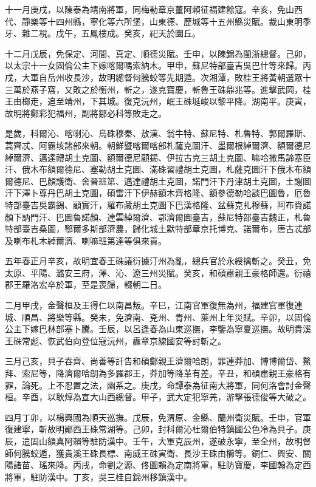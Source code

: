\begin{pinyinscope}
十一月庚戌，以陳泰為靖南將軍，同梅勒章京董阿賴征福建餘寇。辛亥，免山西代、靜樂等十四州縣，寧化等六所堡，山東德、歷城等十五州縣災賦。裁山東明季牙、雜二稅。戊午，五鳳樓成。癸亥，祀天於圜丘。

十二月戊辰，免保定、河間、真定、順德災賦。壬申，以陳錦為閩浙總督。己卯，以太宗十一女固倫公主下嫁喀爾嗎索納木。甲申，蘇尼特部臺吉吳巴什等來歸。丙戌，大軍自岳州收長沙，故明總督何騰蛟等先期遁。次湘潭，敗桂王將黃朝選眾十三萬於燕子窩，又敗之於衡州，斬之，遂克寶慶，斬魯王硃鼎兆等。進擊武岡，桂王由榔走，追至靖州，下其城。復克沅州，岷王硃埏峻以黎平降。湖南平。庚寅，故明將鄭彩犯福州，副將鄒必科等敗走之。

是歲，科爾沁、喀喇沁、烏硃穆秦、敖漢、翁牛特、蘇尼特、札魯特、郭爾羅斯、蒿齊忒、阿霸垓諸部來朝。朝鮮暨喀爾喀部札薩克圖汗、墨爾根綽爾濟、額爾德尼綽爾濟、邁達禮胡土克圖、額爾德尼顧錫、伊拉古克三胡土克圖、嘛哈撒馬諦塞臣汗、俄木布額爾德尼、塞勒胡土克圖、滿硃習禮胡土克圖，札薩克圖汗下俄木布額爾德尼、巴顏護衛、舍晉班第、邁達禮胡土克圖，諾門汗下丹津胡土克圖，土謝圖汗下澤卜尊丹巴胡土克圖，碩雷汗下伊赫額木齊格隆、額參德勒哈談巴圖魯，厄魯特部臺吉吳霸錫、顧實汗，羅布藏胡土克圖下巴漢格隆、盆蘇克扎穆蘇，阿布賚諾顏下訥門汗、巴圖魯諾顏、達雲綽爾濟、鄂濟爾圖臺吉，蘇尼特部臺吉魏正，札魯特部臺吉桑圖，鄂爾多斯部濟農，歸化城土默特部章京托博克、諾爾布，唐古忒部及喇布札木綽爾濟、喇嘛班第達等俱來貢。

五年春正月辛亥，故明宜春王硃議衍據汀州為亂，總兵官於永綬擒斬之。癸丑，免太原、平陽、潞安三府，澤、沁、遼三州災賦。癸亥，和碩肅親王豪格師還。衍禧郡王羅洛宏卒於軍，至是喪歸，輟朝二日。

二月甲戌，金聲桓及王得仁以南昌叛。辛巳，江南官軍復無為州，福建官軍復連城、順昌、將樂等縣。癸未，免濟南、兗州、青州、萊州上年災賦。辛卯，以固倫公主下嫁巴林部塞卜騰。壬辰，以呂逢春為山東巡撫，李鑒為寧夏巡撫。故明貴溪王硃常彪、恢武伯向登位寇沅州，纛章京線國安等討斬之。

三月己亥，貝子吞齊、尚善等訐告和碩鄭親王濟爾哈朗，罪連莽加、博博爾岱、鰲拜、索尼等，降濟爾哈朗為多羅郡王，莽加等降革有差。辛丑，和碩肅親王豪格有罪，論死。上不忍置之法，幽系之。庚戌，命譚泰為征南大將軍，同何洛會討金聲桓。辛酉，以耿焞為宣大山西總督。甲子，武大定犯寧羌，游擊張德俊等大破之。

四月丁卯，以楊興國為順天巡撫。戊辰，免渭原、金縣、蘭州衛災賦。壬申，官軍復建寧，斬故明鄖西王硃常湖等。己卯，封科爾沁杜爾伯特鎮國公色冷為貝子。庚辰，遣固山額真阿賴等駐防漢中。壬午，大軍克辰州，遂破永寧，至全州，故明督師何騰蛟遁，獲貴溪王硃長標、南威王硃寅衛、長沙王硃由櫛等。銅仁、興安、關陽諸苗、瑤來降。丙戌，命劉之源、佟圖賴為定南將軍，駐防寶慶，李國翰為定西將軍，駐防漢中。丁亥，吳三桂自錦州移鎮漢中。


\end{pinyinscope}
